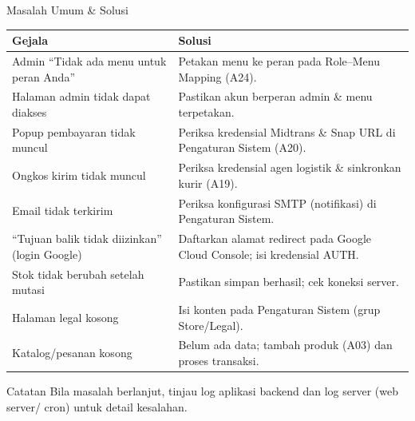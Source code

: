 
\begin{flowsection}{Masalah Umum \& Solusi}
\begin{center}
\renewcommand{\arraystretch}{1.3}
\begin{tabular}{|p{5.5cm}|p{8.5cm}|}
\hline
\textbf{Gejala} & \textbf{Solusi} \\ \hline
Admin ``Tidak ada menu untuk peran Anda'' & Petakan menu ke peran pada Role--Menu Mapping (A24). \\ \hline
Halaman admin tidak dapat diakses & Pastikan akun berperan admin \& menu terpetakan. \\ \hline
Popup pembayaran tidak muncul & Periksa kredensial Midtrans \& Snap URL di Pengaturan Sistem (A20). \\ \hline
Ongkos kirim tidak muncul & Periksa kredensial agen logistik \& sinkronkan kurir (A19). \\ \hline
Email tidak terkirim & Periksa konfigurasi SMTP (notifikasi) di Pengaturan Sistem. \\ \hline
``Tujuan balik tidak diizinkan'' (login Google) & Daftarkan alamat redirect pada Google Cloud Console; isi kredensial AUTH. \\ \hline
Stok tidak berubah setelah mutasi & Pastikan simpan berhasil; cek koneksi server. \\ \hline
Halaman legal kosong & Isi konten pada Pengaturan Sistem (grup Store/Legal). \\ \hline
Katalog/pesanan kosong & Belum ada data; tambah produk (A03) dan proses transaksi. \\ \hline
\end{tabular}
\end{center}
\end{flowsection}

\begin{flowsection}{Catatan}
Bila masalah berlanjut, tinjau log aplikasi backend dan log server (web server/
cron) untuk detail kesalahan.
\end{flowsection}

